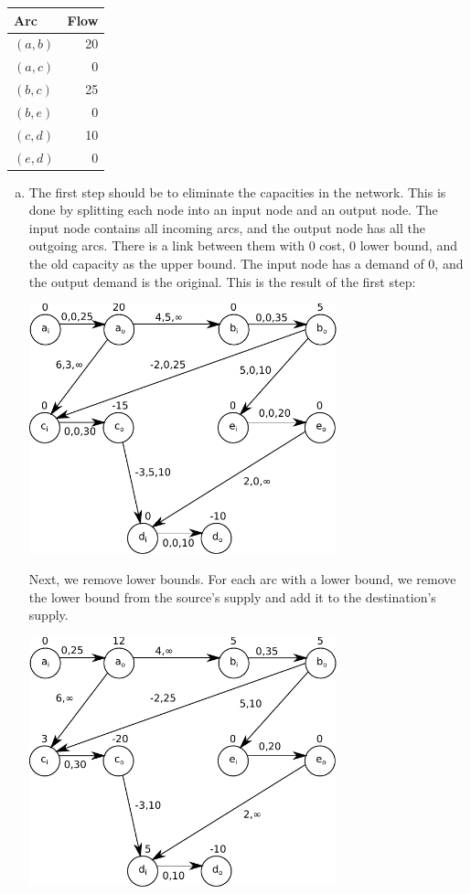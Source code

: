 \documentclass[fleqn]{homework}
\begin{document}
\begin{problem}{1}
\begin{question}
      \begin{tabular}{|l|r|}
        \hline
        Arc & Flow \\
        \hline
        $(a,b)$ & 20 \\
        $(a,c)$ & 0 \\
        $(b,c)$ & 25 \\
        $(b,e)$ & 0 \\
        $(c,d)$ & 10 \\
        $(e,d)$ & 0 \\
        \hline
      \end{tabular}
    \end{question}

    \begin{enumerate}[a.]
    \item The first step should be to eliminate the capacities in the network.
      This is done by splitting each node into an input node and an output node.
      The input node contains all incoming arcs, and the output node has all the
      outgoing arcs.  There is a link between them with 0 cost, 0 lower bound,
      and the old capacity as the upper bound.  The input node has a demand of
      0, and the output demand is the original.  This is the result of the first
      step:

      \includegraphics[width=0.7\textwidth]{problem1-step1.pdf}

      Next, we remove lower bounds.  For each arc with a lower bound, we remove
      the lower bound from the source's supply and add it to the destination's
      supply.

      \includegraphics[width=0.7\textwidth]{problem1-step2.pdf}


\end{enumerate}
\end{problem}
\end{document}
